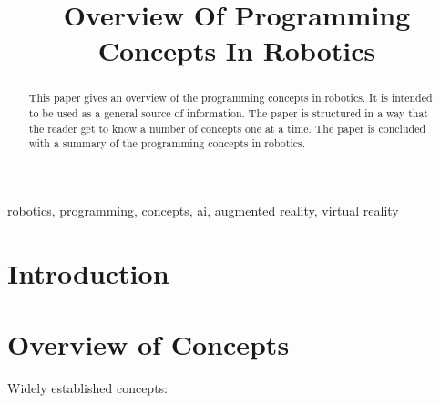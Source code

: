 \documentclass[conference]{IEEEtran}
\begin{document}
\title{Overview Of Programming Concepts In Robotics\\}

\author{

    \and
}

\maketitle

\begin{abstract}
    This paper gives an overview of the programming concepts in robotics. It is intended to be used as a general source of information. The paper is structured in a way that the reader get to know a number of concepts one at a time. The paper is concluded with a summary of the programming concepts in robotics.
\end{abstract}

\begin{IEEEkeywords}
    robotics, programming, concepts, ai, augmented reality, virtual reality 
\end{IEEEkeywords}

\section{Introduction}
  
\section{Overview of Concepts}

Widely established concepts:
\end{document}

